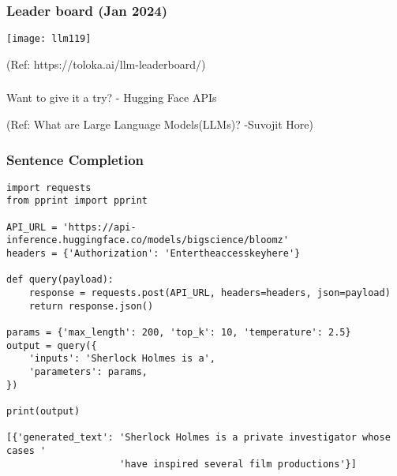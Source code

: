 


\begin{frame}[fragile]\frametitle{Leader board (Jan 2024)}


		\begin{center}

		
		\texttt{[image: llm119]}
		
		{\tiny (Ref: https://toloka.ai/llm-leaderboard/)}
		\end{center}	

\end{frame}

\begin{frame}[fragile]\frametitle{}
\begin{center}
{\Large Want to give it a try? - Hugging Face APIs}

  {\tiny (Ref: What are Large Language Models(LLMs)? -Suvojit Hore)}

\end{center}
\end{frame}

\begin{frame}[fragile]\frametitle{Sentence Completion}


\begin{lstlisting}
import requests
from pprint import pprint

API_URL = 'https://api-inference.huggingface.co/models/bigscience/bloomz'
headers = {'Authorization': 'Entertheaccesskeyhere'}

def query(payload):
    response = requests.post(API_URL, headers=headers, json=payload)
    return response.json()
  
params = {'max_length': 200, 'top_k': 10, 'temperature': 2.5}
output = query({
    'inputs': 'Sherlock Holmes is a',
    'parameters': params,
})

print(output)

[{'generated_text': 'Sherlock Holmes is a private investigator whose cases '
                    'have inspired several film productions'}]
\end{lstlisting}

\end{frame}


